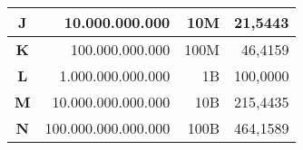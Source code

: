 \begin{table}[htbp]
\begin{tabular}{|c|r|r|r|}
		\hline
		\rowcolor[rgb]{ .851,  .851,  .851} \textbf{J} & \cellcolor[rgb]{ 1,  1,  1}10.000.000.000 & \cellcolor[rgb]{ 1,  1,  1}10M & \cellcolor[rgb]{ 1,  1,  1}21,5443 \bigstrut\\
		\hline
		\rowcolor[rgb]{ .851,  .851,  .851} \textbf{K} & \cellcolor[rgb]{ 1,  1,  1}100.000.000.000 & \cellcolor[rgb]{ 1,  1,  1}100M & \cellcolor[rgb]{ 1,  1,  1}46,4159 \bigstrut\\
		\hline
		\rowcolor[rgb]{ .851,  .851,  .851} \textbf{L} & \cellcolor[rgb]{ 1,  1,  1}1.000.000.000.000 & \cellcolor[rgb]{ 1,  1,  1}1B & \cellcolor[rgb]{ 1,  1,  1}100,0000 \bigstrut\\
		\hline
		\rowcolor[rgb]{ .851,  .851,  .851} \textbf{M} & \cellcolor[rgb]{ 1,  1,  1}10.000.000.000.000 & \cellcolor[rgb]{ 1,  1,  1}10B & \cellcolor[rgb]{ 1,  1,  1}215,4435 \bigstrut\\
		\hline
		\rowcolor[rgb]{ .851,  .851,  .851} \textbf{N} & \cellcolor[rgb]{ 1,  1,  1}100.000.000.000.000 & \cellcolor[rgb]{ 1,  1,  1}100B & \cellcolor[rgb]{ 1,  1,  1}464,1589 \bigstrut\\
		\hline
	\end{tabular}%
	\label{tab:addlabel}%
\end{table}%
